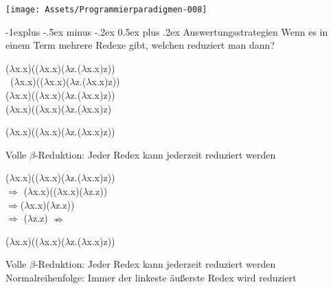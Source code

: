 \documentclass[10pt]{article}
\makeatletter
\renewcommand{\subsection}{\@startsection{subsection}{2}{0mm}%
                                {-1explus -.5ex minus -.2ex}%
                                {0.5ex plus .2ex}%
                                {\normalfont\normalsize\bfseries}}
\makeatother
\begin{document}
\begin{center}
  \texttt{[image: Assets/Programmierparadigmen-008]}
\end{center}


\subsection{Auswertungsstrategien}
Wenn es in einem Term mehrere Redexe gibt, welchen reduziert man dann?

\begin{center}
  ($\lambda$x.x)(($\lambda$x.x)($\lambda$z.($\lambda$x.x)z))\\
  \ ($\lambda$\color{blue}x.x\color{black})\color{red}(($\lambda$x.x)($\lambda$z.($\lambda$x.x)z)) \color{black}\\
  ($\lambda$x.x)(($\lambda$\color{blue}x.x\color{black})\color{red}($\lambda$z.($\lambda$x.x)z)\color{black})\\
  ($\lambda$x.x)(($\lambda$x.x)($\lambda$z.($\lambda$\color{blue}x.x\color{black})\color{red}z\color{black})\\
\end{center}

\begin{center}
  ($\lambda$x.x)(($\lambda$x.x)($\lambda$z.($\lambda$x.x)z))\\
\end{center}

Volle $\beta$-Reduktion: Jeder Redex kann jederzeit reduziert werden 

\begin{center}
  ($\lambda$x.x)(($\lambda$x.x)($\lambda$z.($\lambda$\color{blue}x.x\color{black})\color{red}z\color{black}))\\
  $\Rightarrow$ ($\lambda$x.x)(($\lambda$\color{blue}x.x\color{black})\color{red}($\lambda$z.z)\color{black})\\
  $\Rightarrow$($\lambda$\color{blue}x.x\color{black})\color{red}($\lambda$z.z)\color{black}) \\
  $\Rightarrow$ ($\lambda$z.z)\color{black} $\nRightarrow$
\end{center}

\begin{center}
  ($\lambda$x.x)(($\lambda$x.x)($\lambda$z.($\lambda$x.x)z))\\
\end{center}

Volle $\beta$-Reduktion: Jeder Redex kann jederzeit reduziert werden \newline Normalreihenfolge: Immer der linkeste äußerste Redex wird reduziert
\end{document}
